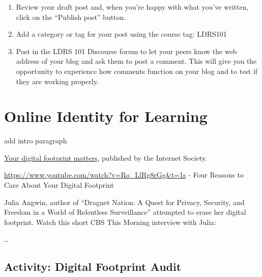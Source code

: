 \documentclass[
]{book}
\theoremstyle{definition}
\theoremstyle{definition}
\theoremstyle{definition}
\theoremstyle{definition}
\theoremstyle{remark}
\begin{document}
\begin{reflect}
\begin{enumerate}
\def\labelenumi{\arabic{enumi}.}
\item
  Review your draft post and, when you're happy with what you've written, click on the ``Publish post'' button.
\item
  Add a category or tag for your post using the course tag: LDRS101
\item
  Post in the LDRS 101 Discourse forum to let your peers know the web address of your blog and ask them to post a comment. This will give you the opportunity to experience how comments function on your blog and to test if they are working properly.
\end{enumerate}
\end{reflect}

\hypertarget{online-identity-for-learning}{%
\section{Online Identity for Learning}\label{online-identity-for-learning}}

add intro paragraph

\href{https://www.internetsociety.org/learning/digital-footprints/}{Your digital footprint matters}, published by the Internet Society.

\url{https://www.youtube.com/watch?v=Ro_LlRg8rGg\&t=1s} - Four Reasons to Care About Your Digital Footprint

Julia Angwin, author of ``Dragnet Nation: A Quest for Privacy, Security, and Freedom in a World of Relentless Surveillance'' attempted to erase her digital footprint.
Watch this short CBS This Morning interview with Julia:

\ldots{}

\hypertarget{activity-digital-footprint-audit}{%
\subsection*{Activity: Digital Footprint Audit}\label{activity-digital-footprint-audit}}
\end{document}
